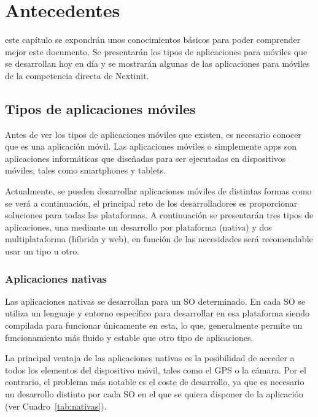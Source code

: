 \chapter{Antecedentes}
\label{chap:antecedentes}

 este capítulo se expondrán unos conocimientos básicos para poder comprender mejor este documento. Se presentarán 
los tipos de aplicaciones para móviles que se desarrollan hoy en día y se mostrarán algunas de las aplicaciones para móviles
de la competencia directa de Nextinit.

\section{Tipos de aplicaciones móviles}

Antes de ver los tipos de aplicaciones móviles que existen, es necesario conocer que es una aplicación móvil. Las aplicaciones
móviles o simplemente apps son aplicaciones informáticas que diseñadas para ser ejecutadas en dispositivos móviles, tales 
como smartphones y tablets.

Actualmente, se pueden desarrollar aplicaciones móviles de distintas formas \cite{ANADES} como se verá a continuación, el 
principal reto de los desarrolladores es proporcionar soluciones para todas las plataformas.  A continuación se presentarán 
tres tipos de aplicaciones, una mediante un desarrollo por plataforma (nativa) y dos multiplataforma (híbrida y web), en 
función de las necesidades será recomendable usar un tipo u otro.

\subsection{Aplicaciones nativas}

Las aplicaciones nativas se desarrollan para un \acf{SO} determinado. En cada \acs{SO} se utiliza un lenguaje y entorno 
específico para desarrollar en esa plataforma siendo compilada para funcionar únicamente en esta, lo que, generalmente 
permite un funcionamiento más fluido y estable que otro tipo de aplicaciones.

La principal ventaja de las aplicaciones nativas es la posibilidad de acceder a todos los elementos del dispositivo móvil, tales
como el GPS o la cámara. Por el contrario, el problema más notable es el coste de desarrollo, ya que es necesario
un desarrollo distinto por cada \acs{SO} en el que se quiera disponer de la aplicación (ver Cuadro~\ref{tab:nativas}).

